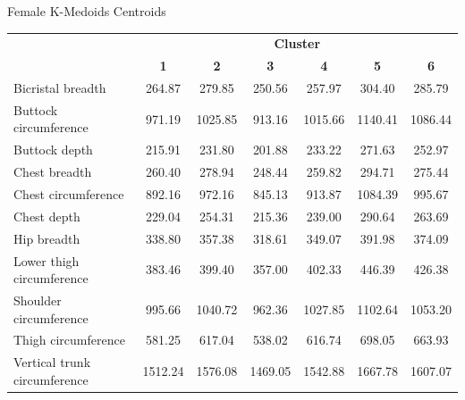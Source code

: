\documentclass[10pt]{beamer}
\begin{document}
\begin{frame}{Female K-Medoids Centroids}
	\scriptsize
	\centering
	\begin{tabular}{lcccccc}
		\cline{2-7}
		                             & \multicolumn{6}{c}{\textbf{Cluster}}                                                                            \\
		                             & \textbf{1}                           & \textbf{2}   & \textbf{3}   & \textbf{4}   & \textbf{5}   & \textbf{6}   \\
		\hline\hline
		Bicristal breadth            & 264.87                               & 279.85       & 250.56       & 257.97       & 304.40       & 285.79       \\
		Buttock circumference        & 971.19                               & 1025.85      & 913.16       & 1015.66      & 1140.41      & 1086.44      \\
		Buttock depth                & 215.91                               & 231.80       & 201.88       & 233.22       & 271.63       & 252.97       \\
		Chest breadth                & 260.40                               & 278.94       & 248.44       & 259.82       & 294.71       & 275.44       \\
		Chest circumference          & 892.16                               & 972.16       & 845.13       & 913.87       & 1084.39      & 995.67       \\
		Chest depth                  & 229.04                               & 254.31       & 215.36       & 239.00       & 290.64       & 263.69       \\
		Hip breadth                  & 338.80                               & 357.38       & 318.61       & 349.07       & 391.98       & 374.09       \\
		Lower thigh circumference    & 383.46                               & 399.40       & 357.00       & 402.33       & 446.39       & 426.38       \\
		Shoulder circumference       & 995.66                               & 1040.72      & 962.36       & 1027.85      & 1102.64      & 1053.20      \\
		Thigh circumference          & 581.25                               & 617.04       & 538.02       & 616.74       & 698.05       & 663.93       \\
		Vertical trunk circumference & 1512.24                              & 1576.08      & 1469.05      & 1542.88      & 1667.78      & 1607.07      \\

\end{tabular}
\end{frame}
\end{document}
